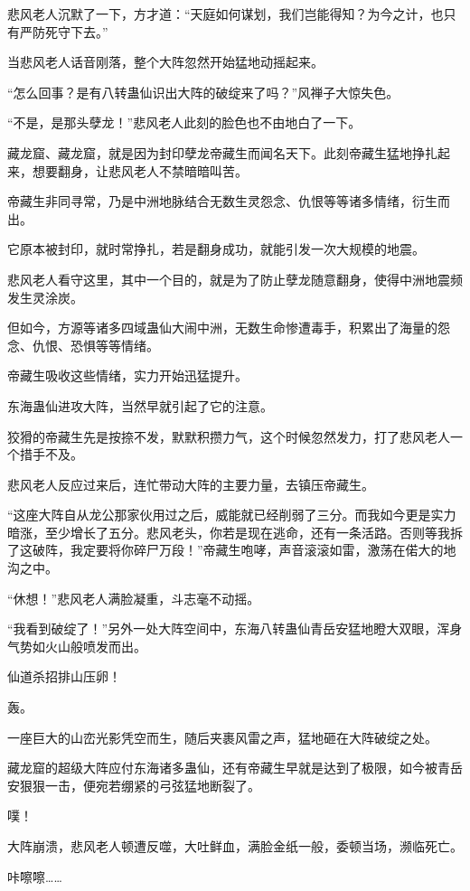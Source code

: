 \begin{this_body}
悲风老人沉默了一下，方才道：“天庭如何谋划，我们岂能得知？为今之计，也只有严防死守下去。”

当悲风老人话音刚落，整个大阵忽然开始猛地动摇起来。

“怎么回事？是有八转蛊仙识出大阵的破绽来了吗？”风禅子大惊失色。

“不是，是那头孽龙！”悲风老人此刻的脸色也不由地白了一下。

藏龙窟、藏龙窟，就是因为封印孽龙帝藏生而闻名天下。此刻帝藏生猛地挣扎起来，想要翻身，让悲风老人不禁暗暗叫苦。

帝藏生非同寻常，乃是中洲地脉结合无数生灵怨念、仇恨等等诸多情绪，衍生而出。

它原本被封印，就时常挣扎，若是翻身成功，就能引发一次大规模的地震。

悲风老人看守这里，其中一个目的，就是为了防止孽龙随意翻身，使得中洲地震频发生灵涂炭。

但如今，方源等诸多四域蛊仙大闹中洲，无数生命惨遭毒手，积累出了海量的怨念、仇恨、恐惧等等情绪。

帝藏生吸收这些情绪，实力开始迅猛提升。

东海蛊仙进攻大阵，当然早就引起了它的注意。

狡猾的帝藏生先是按捺不发，默默积攒力气，这个时候忽然发力，打了悲风老人一个措手不及。

悲风老人反应过来后，连忙带动大阵的主要力量，去镇压帝藏生。

“这座大阵自从龙公那家伙用过之后，威能就已经削弱了三分。而我如今更是实力暗涨，至少增长了五分。悲风老头，你若是现在逃命，还有一条活路。否则等我拆了这破阵，我定要将你碎尸万段！”帝藏生咆哮，声音滚滚如雷，激荡在偌大的地沟之中。

“休想！”悲风老人满脸凝重，斗志毫不动摇。

“我看到破绽了！”另外一处大阵空间中，东海八转蛊仙青岳安猛地瞪大双眼，浑身气势如火山般喷发而出。

仙道杀招排山压卵！

轰。

一座巨大的山峦光影凭空而生，随后夹裹风雷之声，猛地砸在大阵破绽之处。

藏龙窟的超级大阵应付东海诸多蛊仙，还有帝藏生早就是达到了极限，如今被青岳安狠狠一击，便宛若绷紧的弓弦猛地断裂了。

噗！

大阵崩溃，悲风老人顿遭反噬，大吐鲜血，满脸金纸一般，委顿当场，濒临死亡。

咔嚓嚓……


\end{this_body}
